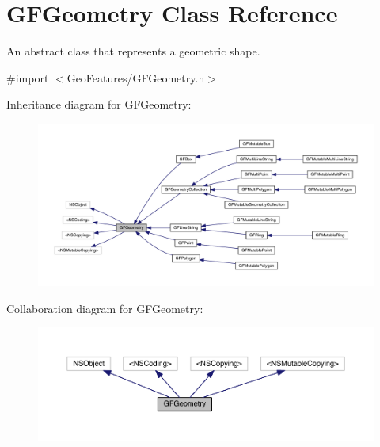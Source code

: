 \hypertarget{interface_g_f_geometry}{}\section{G\+F\+Geometry Class Reference}
\label{interface_g_f_geometry}


An abstract class that represents a geometric shape.  




{\ttfamily \#import $<$Geo\+Features/\+G\+F\+Geometry.\+h$>$}



Inheritance diagram for G\+F\+Geometry\+:
\nopagebreak
\begin{figure}[H]
\begin{center}
\leavevmode
\includegraphics[width=350pt]{interface_g_f_geometry__inherit__graph}
\end{center}
\end{figure}


Collaboration diagram for G\+F\+Geometry\+:\nopagebreak
\begin{figure}[H]
\begin{center}
\leavevmode
\includegraphics[width=350pt]{interface_g_f_geometry__coll__graph}
\end{center}
\end{figure}
